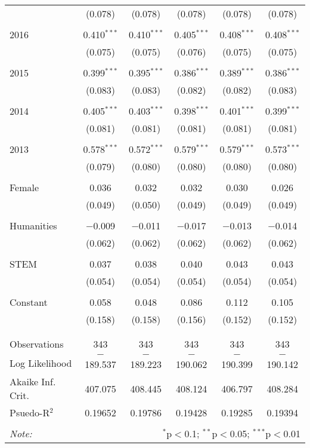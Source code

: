 \begin{table}[H]
\begin{adjustbox}{width=\textwidth, totalheight=\baselineskip}
\begin{tabular}{@{\extracolsep{5pt}}lccccc}
  & (0.078) & (0.078) & (0.078) & (0.078) & (0.078) \\ 
  & & & & & \\ 
 2016 & 0.410$^{***}$ & 0.410$^{***}$ & 0.405$^{***}$ & 0.408$^{***}$ & 0.408$^{***}$ \\ 
  & (0.075) & (0.075) & (0.076) & (0.075) & (0.075) \\ 
  & & & & & \\ 
 2015 & 0.399$^{***}$ & 0.395$^{***}$ & 0.386$^{***}$ & 0.389$^{***}$ & 0.386$^{***}$ \\ 
  & (0.083) & (0.083) & (0.082) & (0.082) & (0.083) \\ 
  & & & & & \\ 
 2014 & 0.405$^{***}$ & 0.403$^{***}$ & 0.398$^{***}$ & 0.401$^{***}$ & 0.399$^{***}$ \\ 
  & (0.081) & (0.081) & (0.081) & (0.081) & (0.081) \\ 
  & & & & & \\ 
 2013 & 0.578$^{***}$ & 0.572$^{***}$ & 0.579$^{***}$ & 0.579$^{***}$ & 0.573$^{***}$ \\ 
  & (0.079) & (0.080) & (0.080) & (0.080) & (0.080) \\ 
  & & & & & \\ 
 Female & 0.036 & 0.032 & 0.032 & 0.030 & 0.026 \\ 
  & (0.049) & (0.050) & (0.049) & (0.049) & (0.049) \\ 
  & & & & & \\ 
 Humanities & $-$0.009 & $-$0.011 & $-$0.017 & $-$0.013 & $-$0.014 \\ 
  & (0.062) & (0.062) & (0.062) & (0.062) & (0.062) \\ 
  & & & & & \\ 
 STEM & 0.037 & 0.038 & 0.040 & 0.043 & 0.043 \\ 
  & (0.054) & (0.054) & (0.054) & (0.054) & (0.054) \\ 
  & & & & & \\ 
 Constant & 0.058 & 0.048 & 0.086 & 0.112 & 0.105 \\ 
  & (0.158) & (0.158) & (0.156) & (0.152) & (0.152) \\ 
  & & & & & \\ 
\hline \\[-1.8ex] 
Observations & 343 & 343 & 343 & 343 & 343 \\ 
Log Likelihood & $-$189.537 & $-$189.223 & $-$190.062 & $-$190.399 & $-$190.142 \\ 
Akaike Inf. Crit. & 407.075 & 408.445 & 408.124 & 406.797 & 408.284 \\ 
Psuedo-R$^{2}$ & 0.19652 & 0.19786 & 0.19428 & 0.19285 & 0.19394 \\
\hline 
\hline \\[-1.8ex] 
\textit{Note:}  & \multicolumn{5}{r}{$^{*}$p$<$0.1; $^{**}$p$<$0.05; $^{***}$p$<$0.01} \\ 
\end{tabular} 
\end{adjustbox}
\end{table} 


